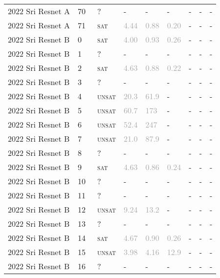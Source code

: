 \begin{center}
{\begin{longtable}{@{}lllllllll@{}}
2022 Sri Resnet A & 70 & ~? & - & - & - & - & - & - \\
2022 Sri Resnet A & 71 & ~\textsc{sat} & \textcolor{darkgray}{4.44} & \textcolor{darkgray}{0.88} & \textcolor{darkgray}{0.20} & - & - & - \\
\midrule
2022 Sri Resnet B & 0 & ~\textsc{sat} & \textcolor{darkgray}{4.00} & \textcolor{darkgray}{0.93} & \textcolor{darkgray}{0.26} & - & - & - \\
2022 Sri Resnet B & 1 & ~? & - & - & - & - & - & - \\
2022 Sri Resnet B & 2 & ~\textsc{sat} & \textcolor{darkgray}{4.63} & \textcolor{darkgray}{0.88} & \textcolor{darkgray}{0.22} & - & - & - \\
2022 Sri Resnet B & 3 & ~? & - & - & - & - & - & - \\
2022 Sri Resnet B & 4 & ~\textsc{unsat} & \textcolor{darkgray}{20.3} & \textcolor{darkgray}{61.9} & - & - & - & - \\
2022 Sri Resnet B & 5 & ~\textsc{unsat} & \textcolor{darkgray}{60.7} & \textcolor{darkgray}{173} & - & - & - & - \\
2022 Sri Resnet B & 6 & ~\textsc{unsat} & \textcolor{darkgray}{52.4} & \textcolor{darkgray}{247} & - & - & - & - \\
2022 Sri Resnet B & 7 & ~\textsc{unsat} & \textcolor{darkgray}{21.0} & \textcolor{darkgray}{87.9} & - & - & - & - \\
2022 Sri Resnet B & 8 & ~? & - & - & - & - & - & - \\
2022 Sri Resnet B & 9 & ~\textsc{sat} & \textcolor{darkgray}{4.63} & \textcolor{darkgray}{0.86} & \textcolor{darkgray}{0.24} & - & - & - \\
2022 Sri Resnet B & 10 & ~? & - & - & - & - & - & - \\
2022 Sri Resnet B & 11 & ~? & - & - & - & - & - & - \\
2022 Sri Resnet B & 12 & ~\textsc{unsat} & \textcolor{darkgray}{9.24} & \textcolor{darkgray}{13.2} & - & - & - & - \\
2022 Sri Resnet B & 13 & ~? & - & - & - & - & - & - \\
2022 Sri Resnet B & 14 & ~\textsc{sat} & \textcolor{darkgray}{4.67} & \textcolor{darkgray}{0.90} & \textcolor{darkgray}{0.26} & - & - & - \\
2022 Sri Resnet B & 15 & ~\textsc{unsat} & \textcolor{darkgray}{3.98} & \textcolor{darkgray}{4.16} & \textcolor{darkgray}{12.9} & - & - & - \\
2022 Sri Resnet B & 16 & ~? & - & - & - & - & - & - \\

\end{longtable}}
\end{center}
